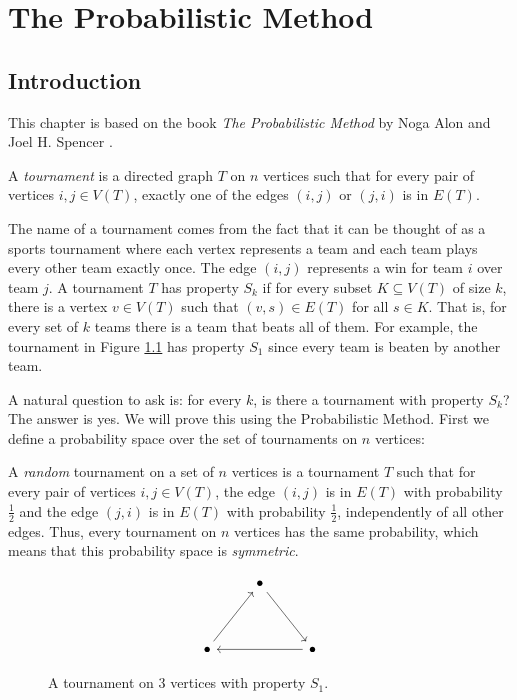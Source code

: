 \chapter{The Probabilistic Method}\label{chap:probmet}

\section{Introduction}\label{sec:probmet:intro}

This chapter is based on the book \textit{The Probabilistic Method} by Noga Alon and Joel H. Spencer \cite{alon2016probabilistic}. \par

\begin{definition}\label{def:tournament} 
A \textit{tournament} is a directed graph $T$ on $n$ vertices such that for every pair of vertices $i, j \in V(T)$, exactly one of the edges $(i, j)$ or $(j, i)$ is in $E(T)$. 
\end{definition}

The name of a tournament comes from the fact that it can be thought of as a sports tournament where each vertex represents a team and each team plays every other team exactly once. The edge $(i, j)$ represents a win for team $i$ over team $j$. A tournament $T$ has property $S_k$ if for every subset $K \subseteq V(T)$ of size $k$, there is a vertex $v \in V(T)$ such that $(v, s) \in E(T)$ for all $s \in K$. That is, for every set of $k$ teams there is a team that beats all of them. For example, the tournament in Figure \ref{fig:tournament} has property $S_1$ since every team is beaten by another team. \par

A natural question to ask is: for every $k$, is there a tournament with property $S_k$? The answer is yes. We will prove this using the Probabilistic Method. First we define a probability space over the set of tournaments on $n$ vertices: \par 
A \textit{random} tournament on a set of $n$ vertices is a tournament $T$ such that for every pair of vertices $i, j \in V(T)$, the edge $(i, j)$ is in $E(T)$ with probability $\frac{1}{2}$ and the edge $(j, i)$ is in $E(T)$ with probability $\frac{1}{2}$, independently of all other edges. Thus, every tournament on $n$ vertices has the same probability, which means that this probability space is \textit{symmetric}. \par

\begin{figure}
    \centering
    \[\begin{tikzcd}
        & \bullet \\
        \\
        \bullet && \bullet
        \arrow[from=3-1, to=1-2]
        \arrow[from=1-2, to=3-3]
        \arrow[from=3-3, to=3-1]
    \end{tikzcd}\]
    \caption{A tournament on 3 vertices with property $S_1$.}
    \label{fig:tournament}
\end{figure}

